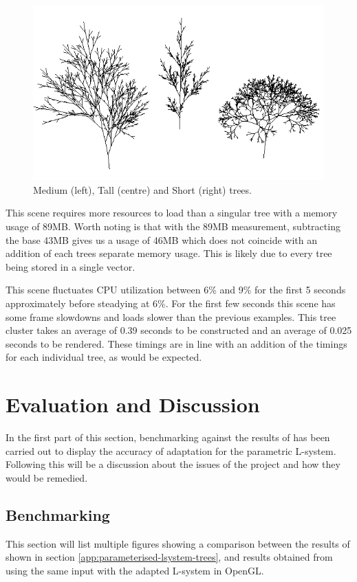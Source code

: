 \documentclass[final]{cmpreport}
\begin{document}
\begin{figure}[ht]
    \includegraphics[scale=0.7]{trees-ghi.PNG} 
    \centering
    \captionsetup{justification=centering}
    \caption{Medium (left), Tall (centre) and Short (right) trees.}
    \label{fig:trees-ghi}
\end{figure}

This scene requires more resources to load than a singular tree with a memory usage of 89MB. 
Worth noting is that with the 89MB measurement, subtracting the base 43MB gives us a usage of 
46MB which does not coincide with an addition of each trees separate memory usage.
This is likely due to every tree being stored in a single vector.

This scene fluctuates CPU utilization between 6\% and 9\% for the first 5 seconds 
approximately before steadying at 6\%. For the first few seconds this scene has some frame 
slowdowns and loads slower than the previous examples. This tree cluster takes 
an average of 0.39 seconds to be constructed and an average of 0.025 seconds to be rendered. 
These timings are in line with an addition of the timings for each individual tree, as would 
be expected.

\section{Evaluation and Discussion}
In the first part of this section, benchmarking against the results of \cite{prusinkiewicz1996systems} 
has been carried out to display the accuracy of adaptation for the parametric L-system. Following 
this will be a discussion about the issues of the project and how they would be remedied. 

\subsection{Benchmarking}
This section will list multiple figures showing a comparison between the results of \cite{prusinkiewicz1996systems} 
shown in section \ref{app:parameterised-lsystem-trees}, and results obtained from using the 
same input with the adapted L-system in OpenGL.
\end{document}
